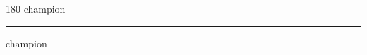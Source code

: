 
\begin{frame}
\begin{center}
\begin{turn}{180}
{\fontsize{2.5cm}{1em}\selectfont champion}
\end{turn}
\vspace{1em}\par  
\hrule
\vspace{1em}\par  
{\fontsize{2.5cm}{1em}\selectfont champion}
\end{center}
\end{frame}
